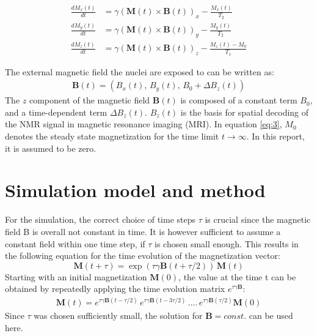 \documentclass[journal]{IEEEtran} %
\begin{document}
\begin{align}
\frac {d M_x(t)} {d t} &= \gamma ( \mathbf {M} (t) \times \mathbf {B} (t)  )_x - \frac {M_x(t)} {T_2} \\
\frac {d M_y(t)} {d t} &= \gamma ( \mathbf {M} (t) \times \mathbf {B} (t)  )_y - \frac {M_y(t)} {T_2} \\
\frac {d M_z(t)} {d t} &= \gamma ( \mathbf {M} (t) \times \mathbf {B} (t)  )_z - \frac {M_z(t) - M_0} {T_1} \label{eq:3}
\end{align}

The external magnetic field the nuclei are exposed to can be written as:
\begin{align}
    \mathbf{B}(t) = (B_x(t),\, B_y(t),\, B_0 + \Delta B_z(t))
\end{align}
The $z$ component of the magnetic field $\mathbf{B}(t)$ is composed of a constant term $B_0$, and a time-dependent term $\Delta B_z(t)$. $B_z(t)$ is the basis for spatial decoding of the NMR signal in magnetic resonance imaging (MRI). In equation \eqref{eq:3}, $M_0$ denotes the steady state magnetization for the time limit $t \rightarrow \infty$. In this report, it is assumed to be zero.



\section{Simulation model and method}
For the simulation, the correct choice of time steps $\tau$ is crucial since the magnetic field B is overall not constant in time. It is however sufficient to assume a constant field within one time step, if $\tau$ is chosen small enough. This results in the following equation for the time evolution of the magnetization vector:
\begin{equation}
    \mathbf{M}(t+\tau) = \exp(\tau \gamma \mathbf{B}(t+ \tau/2)) \, \mathbf{M}(t)
\end{equation}
Starting with an initial magnetization $\textbf{M}(0)$, the value at the time t can be obtained by repeatedly applying the time evolution matrix $e^{\tau \gamma \mathbf{B}}$:
\begin{align}
    \mathbf{M}(t)= e^{\tau \gamma \mathbf{B}(t-\tau/2)} \, e^{\tau \gamma \mathbf{B}(t-3\tau/2)}\, ....\, e^{\tau \gamma \mathbf{B}(\tau/2)}\mathbf{M}(0)
\end{align}
Since $\tau$ was chosen sufficiently small, the solution for $\textbf{B} = const.$ can be used here.
\end{document}
